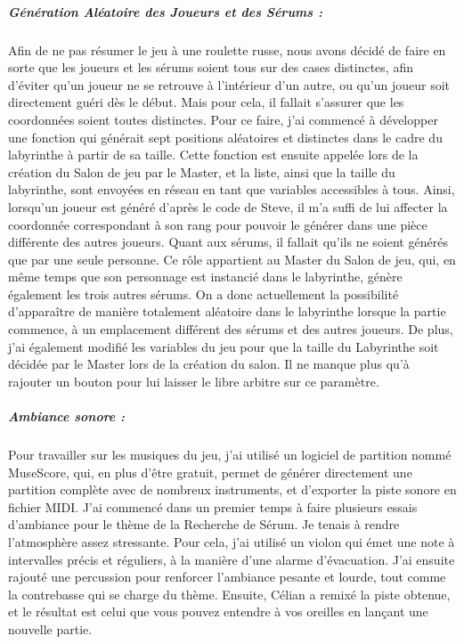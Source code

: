 \documentclass{article}
\begin{document}
\subparagraph{Génération Aléatoire des Joueurs et des Sérums :}


Afin de ne pas résumer le jeu à une roulette russe, nous avons décidé de faire en sorte que les joueurs et les sérums soient tous sur des cases distinctes, afin d'éviter qu'un joueur ne se retrouve à l'intérieur d'un autre, ou qu'un joueur soit directement guéri dès le début. Mais pour cela, il fallait s'assurer que les coordonnées soient toutes distinctes. Pour ce faire, j'ai commencé à développer une fonction qui générait sept positions aléatoires et distinctes dans le cadre du labyrinthe à partir de sa taille. Cette fonction est ensuite appelée lors de la création du Salon de jeu par le Master, et la liste, ainsi que la taille du labyrinthe, sont envoyées en réseau en tant que variables accessibles à tous. Ainsi, lorsqu'un joueur est généré d'après le code de Steve, il m'a suffi de lui affecter la coordonnée correspondant à son rang pour pouvoir le générer dans une pièce différente des autres joueurs. Quant aux sérums, il fallait qu'ils ne soient générés que par une seule personne. Ce rôle appartient au Master du Salon de jeu, qui, en même temps que son personnage est instancié dans le labyrinthe, génère également les trois autres sérums. On a donc actuellement la possibilité d'apparaître de manière totalement aléatoire dans le labyrinthe lorsque la partie commence, à un emplacement différent des sérums et des autres joueurs. De plus, j'ai également modifié les variables du jeu pour que la taille du Labyrinthe soit décidée par le Master lors de la création du salon. Il ne manque plus qu'à rajouter un bouton pour lui laisser le libre arbitre sur ce paramètre.


\subparagraph{Ambiance sonore :}

Pour travailler sur les musiques du jeu, j'ai utilisé un logiciel de partition nommé MuseScore, qui, en plus d'être gratuit, permet de générer directement une partition complète avec de nombreux instruments, et d'exporter la piste sonore en fichier MIDI. J'ai commencé dans un premier temps à faire plusieurs essais d'ambiance pour le thème de la Recherche de Sérum. Je tenais à rendre l'atmosphère assez stressante. Pour cela, j'ai utilisé un violon qui émet une note à intervalles précis et réguliers, à la manière d'une alarme d'évacuation. J'ai ensuite rajouté une percussion pour renforcer l'ambiance pesante et lourde, tout comme la contrebasse qui se charge du thème. Ensuite, Célian a remixé la piste obtenue, et le résultat est celui que vous pouvez entendre à vos oreilles en lançant une nouvelle partie.
\end{document}
